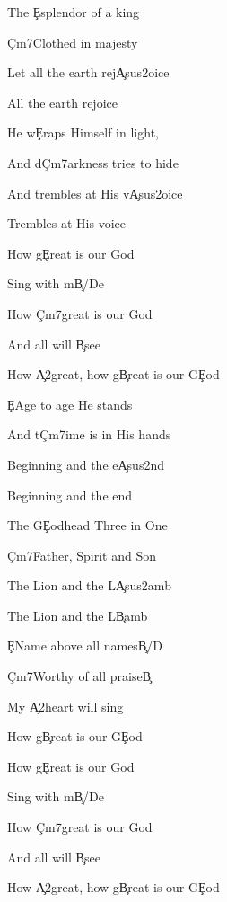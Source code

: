 \documentclass[9pt]{extarticle}
\begin{document}
\bsong

\bv
The \c{E}splendor of a king

\c{C\s m7}Clothed in majesty

Let all the earth rej\c{Asus2}oice

All the earth rejoice
\ev

\bv
He w\c{E}raps Himself in light,

And d\c{C\s m7}arkness tries to hide

And trembles at His v\c{Asus2}oice

Trembles at His voice
\ev

\bc
How g\c{E}reat is our God

Sing with m\c{B/D\s }e

How \c{C\s m7}great is our God

And all will \c{B}see

How \c{A2}great, how g\c{B}reat is our G\c{E}od
\ec

\bv
\c{E}Age to age He stands

And t\c{C\s m7}ime is in His hands

Beginning and the e\c{Asus2}nd

Beginning and the end
\ev

\bv
The G\c{E}odhead Three in One

\c{C\s m7}Father, Spirit and Son

The Lion and the L\c{Asus2}amb

The Lion and the L\c{B}amb
\ev


\bb[2]
\c{E}Name above all names\c{B/D\s }

\c{C\s m7}Worthy of all praise\c{B}

My \c{A2}heart will sing

How g\c{B}reat is our G\c{E}od
\eb


\bo
How g\c{E}reat is our God

Sing with m\c{B/D\s }e

How \c{C\s m7}great is our God

And all will \c{B}see

How \c{A2}great, how g\c{B}reat is our G\c{E}od
\eo

\esong
\end{document}
